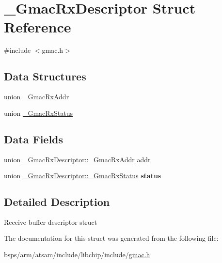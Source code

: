 \hypertarget{struct__GmacRxDescriptor}{}\section{\+\_\+\+Gmac\+Rx\+Descriptor Struct Reference}
\label{struct__GmacRxDescriptor}


{\ttfamily \#include $<$gmac.\+h$>$}

\subsection*{Data Structures}
\begin{DoxyCompactItemize}
\item 
union \mbox{\hyperlink{union__GmacRxDescriptor_1_1__GmacRxAddr}{\+\_\+\+Gmac\+Rx\+Addr}}
\item 
union \mbox{\hyperlink{union__GmacRxDescriptor_1_1__GmacRxStatus}{\+\_\+\+Gmac\+Rx\+Status}}
\end{DoxyCompactItemize}
\subsection*{Data Fields}
\begin{DoxyCompactItemize}
\item 
union \mbox{\hyperlink{union__GmacRxDescriptor_1_1__GmacRxAddr}{\+\_\+\+Gmac\+Rx\+Descriptor\+::\+\_\+\+Gmac\+Rx\+Addr}} \mbox{\hyperlink{group__gmac__defines_ga9bc3c47006fd42d92c6fdef66a1b4762}{addr}}
\item 
union \mbox{\hyperlink{union__GmacRxDescriptor_1_1__GmacRxStatus}{\+\_\+\+Gmac\+Rx\+Descriptor\+::\+\_\+\+Gmac\+Rx\+Status}} {\bfseries status}
\end{DoxyCompactItemize}


\subsection{Detailed Description}
Receive buffer descriptor struct 

The documentation for this struct was generated from the following file\+:\begin{DoxyCompactItemize}
\item 
bsps/arm/atsam/include/libchip/include/\mbox{\hyperlink{gmac_8h}{gmac.\+h}}\end{DoxyCompactItemize}
